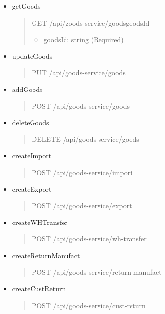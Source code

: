 \begin{itemize}
	\item getGoods
	\begin{quote}
		GET /api/goods-service/goods{goodsId}
		\begin{itemize}
			\item goodsId: string (Required)
		\end{itemize}
	\end{quote}

	\item updateGoods
	\begin{quote}
		PUT /api/goods-service/goods
	\end{quote}

	\item addGoods
	\begin{quote}
		POST /api/goods-service/goods
	\end{quote}

	\item deleteGoods
	\begin{quote}
		DELETE /api/goods-service/goods
	\end{quote}

	\item createImport
	\begin{quote}
		POST /api/goods-service/import
	\end{quote}

	\item createExport
	\begin{quote}
		POST /api/goods-service/export
	\end{quote}

	\item createWHTransfer
	\begin{quote}
		POST /api/goods-service/wh-transfer
	\end{quote}

	\item createReturnManufact	
	\begin{quote}
		POST /api/goods-service/return-manufact
	\end{quote}

	\item createCustReturn
	\begin{quote}
		POST /api/goods-service/cust-return
	\end{quote}
\end{itemize}

